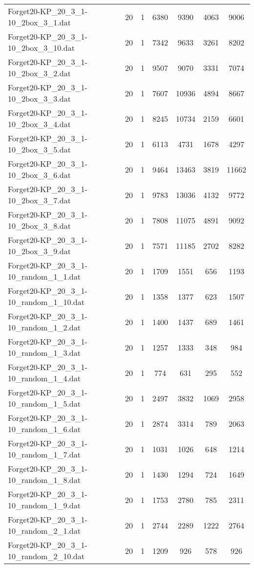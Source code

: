\begin{table}[!ht]
\begin{tabular}{lcccccc}
Forget20-KP\_20\_3\_1-10\_2box\_3\_1.dat & 20 & 1 & 6380 & 9390 & 4063 & 9006 \\
Forget20-KP\_20\_3\_1-10\_2box\_3\_10.dat & 20 & 1 & 7342 & 9633 & 3261 & 8202 \\
Forget20-KP\_20\_3\_1-10\_2box\_3\_2.dat & 20 & 1 & 9507 & 9070 & 3331 & 7074 \\
Forget20-KP\_20\_3\_1-10\_2box\_3\_3.dat & 20 & 1 & 7607 & 10936 & 4894 & 8667 \\
Forget20-KP\_20\_3\_1-10\_2box\_3\_4.dat & 20 & 1 & 8245 & 10734 & 2159 & 6601 \\
Forget20-KP\_20\_3\_1-10\_2box\_3\_5.dat & 20 & 1 & 6113 & 4731 & 1678 & 4297 \\
Forget20-KP\_20\_3\_1-10\_2box\_3\_6.dat & 20 & 1 & 9464 & 13463 & 3819 & 11662 \\
Forget20-KP\_20\_3\_1-10\_2box\_3\_7.dat & 20 & 1 & 9783 & 13036 & 4132 & 9772 \\
Forget20-KP\_20\_3\_1-10\_2box\_3\_8.dat & 20 & 1 & 7808 & 11075 & 4891 & 9092 \\
Forget20-KP\_20\_3\_1-10\_2box\_3\_9.dat & 20 & 1 & 7571 & 11185 & 2702 & 8282 \\
Forget20-KP\_20\_3\_1-10\_random\_1\_1.dat & 20 & 1 & 1709 & 1551 & 656 & 1193 \\
Forget20-KP\_20\_3\_1-10\_random\_1\_10.dat & 20 & 1 & 1358 & 1377 & 623 & 1507 \\
Forget20-KP\_20\_3\_1-10\_random\_1\_2.dat & 20 & 1 & 1400 & 1437 & 689 & 1461 \\
Forget20-KP\_20\_3\_1-10\_random\_1\_3.dat & 20 & 1 & 1257 & 1333 & 348 & 984 \\
Forget20-KP\_20\_3\_1-10\_random\_1\_4.dat & 20 & 1 & 774 & 631 & 295 & 552 \\
Forget20-KP\_20\_3\_1-10\_random\_1\_5.dat & 20 & 1 & 2497 & 3832 & 1069 & 2958 \\
Forget20-KP\_20\_3\_1-10\_random\_1\_6.dat & 20 & 1 & 2874 & 3314 & 789 & 2063 \\
Forget20-KP\_20\_3\_1-10\_random\_1\_7.dat & 20 & 1 & 1031 & 1026 & 648 & 1214 \\
Forget20-KP\_20\_3\_1-10\_random\_1\_8.dat & 20 & 1 & 1430 & 1294 & 724 & 1649 \\
Forget20-KP\_20\_3\_1-10\_random\_1\_9.dat & 20 & 1 & 1753 & 2780 & 785 & 2311 \\
Forget20-KP\_20\_3\_1-10\_random\_2\_1.dat & 20 & 1 & 2744 & 2289 & 1222 & 2764 \\
Forget20-KP\_20\_3\_1-10\_random\_2\_10.dat & 20 & 1 & 1209 & 926 & 578 & 926 \\

\end{tabular}
\end{table}
